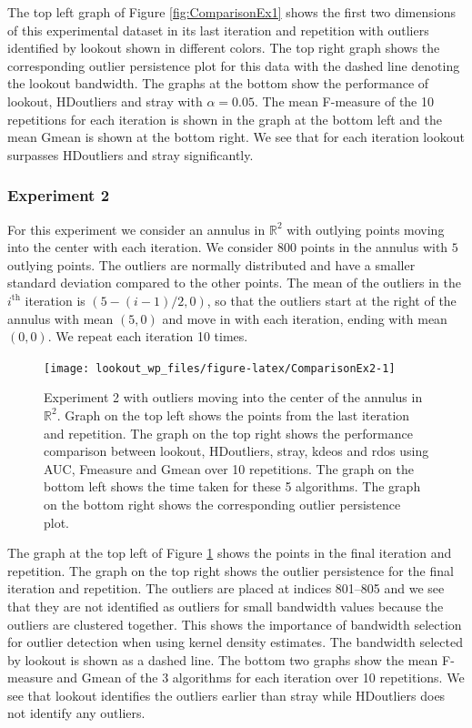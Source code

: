 \documentclass[11pt,a4paper,]{article}
\theoremstyle{definition}
\theoremstyle{definition}
\theoremstyle{definition}
\theoremstyle{remark}
\begin{document}
The top left graph of Figure \ref{fig:ComparisonEx1} shows the first two dimensions of this experimental dataset in its last iteration and repetition with outliers identified by lookout shown in different colors. The top right graph shows the corresponding outlier persistence plot for this data with the dashed line denoting the lookout bandwidth. The graphs at the bottom show the performance of lookout, HDoutliers and stray with \(\alpha = 0.05\). The mean F-measure of the 10 repetitions for each iteration is shown in the graph at the bottom left and the mean Gmean is shown at the bottom right. We see that for each iteration lookout surpasses HDoutliers and stray significantly.

\hypertarget{experiment-2}{%
\subsubsection*{Experiment 2}\label{experiment-2}}

For this experiment we consider an annulus in \(\mathbb{R}^2\) with outlying points moving into the center with each iteration. We consider \(800\) points in the annulus with \(5\) outlying points. The outliers are normally distributed and have a smaller standard deviation compared to the other points. The mean of the outliers in the \(i^{\text{th}}\) iteration is \(\left( 5 - (i-1) /2, 0 \right)\), so that the outliers start at the right of the annulus with mean \((5,0)\) and move in with each iteration, ending with mean \((0,0)\). We repeat each iteration 10 times.

\begin{figure}
\texttt{[image: lookout\_wp\_files/figure-latex/ComparisonEx2-1]} \caption{Experiment 2 with outliers moving into the center of the annulus in $\mathbb{R}^2$. Graph on the top left shows the points from the last iteration and repetition. The graph on the top right shows the performance comparison between lookout, HDoutliers, stray, kdeos and rdos using AUC, Fmeasure and Gmean over 10 repetitions. The graph on the bottom left shows the time taken for these 5 algorithms. The graph on the bottom right shows the corresponding outlier persistence plot.}\label{fig:ComparisonEx2}
\end{figure}

The graph at the top left of Figure \ref{fig:ComparisonEx2} shows the points in the final iteration and repetition. The graph on the top right shows the outlier persistence for the final iteration and repetition. The outliers are placed at indices 801--805 and we see that they are not identified as outliers for small bandwidth values because the outliers are clustered together. This shows the importance of bandwidth selection for outlier detection when using kernel density estimates. The bandwidth selected by lookout is shown as a dashed line. The bottom two graphs show the mean F-measure and Gmean of the 3 algorithms for each iteration over 10 repetitions. We see that lookout identifies the outliers earlier than stray while HDoutliers does not identify any outliers.
\end{document}
